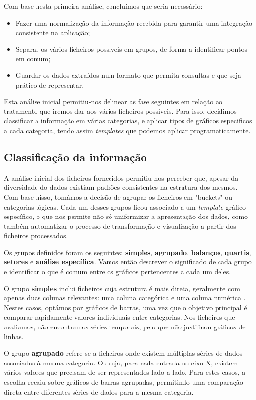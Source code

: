 Com base nesta primeira análise, concluímos que seria necessário:
\begin{itemize}
    \item Fazer uma normalização da informação recebida para garantir uma integração consistente na aplicação;
    \item Separar os vários ficheiros possiveis em grupos, de forma a identificar pontos em comum;
    \item Guardar os dados extraídos num formato que permita consultas e que seja prático de representar.
\end{itemize}

Esta análise inicial permitiu-nos delinear as fase seguintes em relação ao tratamento que iremos dar aos vários ficheiros possiveis. Para isso, decidimos classificar a informação em várias categorias, e aplicar tipos de gráficos especificos a cada categoria, tendo assim \textit{templates} que podemos aplicar programaticamente. 

\subsection{Classificação da informação}

A análise inicial dos ficheiros fornecidos permitiu-nos perceber que, apesar da diversidade do dados existiam padrões consistentes na estrutura dos mesmos. Com base nisso, tomámos a decisão de agrupar os ficheiros em "buckets" ou categorias lógicas. Cada um desses grupos ficou associado a um \textit{template} gráfico específico, o que nos permite não só uniformizar a apresentação dos dados, como também automatizar o processo de transformação e visualização a partir dos ficheiros processados.

Os grupos definidos foram os seguintes: \textbf{simples}, \textbf{agrupado}, \textbf{balanços}, \textbf{quartis}, \textbf{setores} e \textbf{análise específica}. Vamos então descrever o significado de cada grupo e identificar o que é comum entre os gráficos pertencentes a cada um deles.

O grupo \textbf{simples} inclui ficheiros cuja estrutura é mais direta, geralmente com apenas duas colunas relevantes: uma coluna categórica e uma coluna numérica . Nestes casos, optámos por gráficos de barras, uma vez que o objetivo principal é comparar rapidamente valores individuais entre categorias. Nos ficheiros que avaliamos, não encontramos séries temporais, pelo que não justificou gráficos de linhas.

O grupo \textbf{agrupado} refere-se a ficheiros onde existem múltiplas séries de dados associadas à mesma categoria. Ou seja, para cada entrada no eixo X, existem vários valores que precisam de ser representados lado a lado. Para estes casos, a escolha recaiu sobre gráficos de barras agrupadas, permitindo uma comparação direta entre diferentes séries de dados para a mesma categoria.

